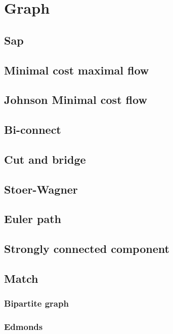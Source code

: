 \section{Graph}
\subsection{Sap}

\subsection{Minimal cost maximal flow}

\subsection{Johnson Minimal cost flow}

\subsection{Bi-connect}

\subsection{Cut and bridge}

\subsection{Stoer-Wagner}

\subsection{Euler path}

\subsection{Strongly connected component}


\subsection{Match}
\subsubsection{Bipartite graph}

\subsubsection{Edmonds}

